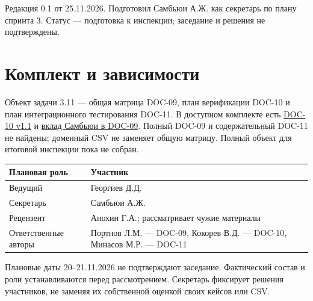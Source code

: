 \documentclass[12pt,a4paper]{article}
\newcounter{none} %
\begin{document}
Редакция 0.1 от 25.11.2026. Подготовил Самбьюи А.Ж. как секретарь по плану спринта 3. Статус --- подготовка к инспекции; заседание и решения не подтверждены.

\section{Комплект и зависимости}\label{ux43aux43eux43cux43fux43bux435ux43aux442-ux438-ux437ux430ux432ux438ux441ux438ux43cux43eux441ux442ux438}

\hypertarget{комплект-и-зависимости}{}

Объект задачи 3.11 --- общая матрица DOC-09, план верификации DOC-10 и план интеграционного тестирования DOC-11. В доступном комплекте есть {\href{../10\_Верификация\_и\_тестирование/DOC-10\_План\_верификации.pdf\#doc-10-план-верификации-программного-обеспечения}{DOC-10 v1.1}} и {\href{../05\_Трассировка/DOC-09\_Вклад\_Самбьюи.pdf\#doc-09-вклад-самбьюи-в-матрицу-трассировки}{вклад Самбьюи в DOC-09}}. Полный DOC-09 и содержательный DOC-11 не найдены; доменный CSV не заменяет общую матрицу. Полный объект для итоговой инспекции пока не собран.

{\def\LTcaptype{none} %
\begin{longtable}[]{@{}
  >{\raggedright\arraybackslash}p{}
  >{\raggedright\arraybackslash}p{}@{}}
\toprule\noalign{}
\begin{minipage}[b]{\linewidth}\raggedright
Плановая роль
\end{minipage} & \begin{minipage}[b]{\linewidth}\raggedright
Участник
\end{minipage} \\
\midrule\noalign{}
\endhead
\bottomrule\noalign{}
\endlastfoot
Ведущий & Георгиев Д.Д. \\
Секретарь & Самбьюи А.Ж. \\
Рецензент & Анохин Г.А.; рассматривает чужие материалы \\
Ответственные авторы & Портнов Л.М. --- DOC-09, Кокорев В.Д. --- DOC-10, Минасов М.Р. --- DOC-11 \\
\end{longtable}
}

Плановые даты 20--21.11.2026 не подтверждают заседание. Фактический состав и роли устанавливаются перед рассмотрением. Секретарь фиксирует решения участников, не заменяя их собственной оценкой своих кейсов или CSV.
\end{document}

